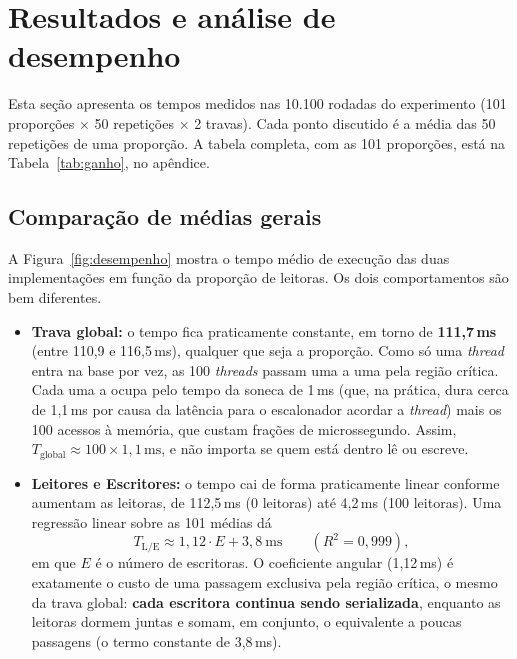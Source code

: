 \documentclass[11pt, a4paper]{article}
\begin{document}
\section{Resultados e análise de desempenho}
\label{sec:resultados}

Esta seção apresenta os tempos medidos nas 10.100 rodadas do experimento (101 proporções
$\times$ 50 repetições $\times$ 2 travas). Cada ponto discutido é a média das 50 repetições
de uma proporção. A tabela completa, com as 101 proporções, está na
Tabela~\ref{tab:ganho}, no apêndice.

\subsection{Comparação de médias gerais}
\label{sec:medias}

A Figura~\ref{fig:desempenho} mostra o tempo médio de execução das duas implementações em
função da proporção de leitoras. Os dois comportamentos são bem diferentes.

\begin{itemize}
    \item \textbf{Trava global:} o tempo fica praticamente constante, em torno de
    \textbf{111,7\,ms} (entre 110,9 e 116,5\,ms), qualquer que seja a proporção. Como só uma
    \textit{thread} entra na base por vez, as 100 \textit{threads} passam uma a uma pela região
    crítica. Cada uma a ocupa pelo tempo da soneca de 1\,ms (que, na prática, dura cerca de
    1,1\,ms por causa da latência para o escalonador acordar a \textit{thread}) mais os 100
    acessos à memória, que custam frações de microssegundo. Assim,
    $T_{\text{global}} \approx 100 \times 1{,}1\,\text{ms}$, e não importa se quem está dentro
    lê ou escreve.

    \item \textbf{Leitores e Escritores:} o tempo cai de forma praticamente linear conforme
    aumentam as leitoras, de 112,5\,ms (0 leitoras) até 4,2\,ms (100 leitoras). Uma regressão
    linear sobre as 101 médias dá
    \[
        T_{\text{L/E}} \approx 1{,}12 \cdot E + 3{,}8\ \text{ms} \qquad (R^2 = 0{,}999),
    \]
    em que $E$ é o número de escritoras. O coeficiente angular (1,12\,ms) é exatamente o custo
    de uma passagem exclusiva pela região crítica, o mesmo da trava global: \textbf{cada
    escritora continua sendo serializada}, enquanto as leitoras dormem juntas e somam, em
    conjunto, o equivalente a poucas passagens (o termo constante de 3,8\,ms).
\end{itemize}
\end{document}
